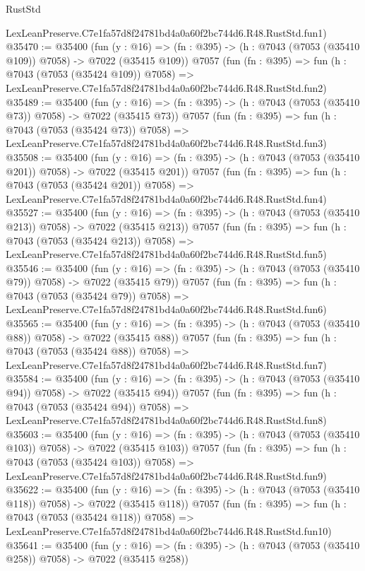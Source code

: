 \begin{lexlean}{RustStd}
\begin{coremodule}
    LexLeanPreserve.C7e1fa57d8f24781bd4a0a60f2bc744d6.R48.RustStd.fun1)
@35470 := @35400
    (fun (y : @16) => (fn : @395) -> (h : @7043 (@7053 (@35410 @109)) @7058) -> @7022 (@35415 @109))
    @7057
    (fun (fn : @395) =>
    fun (h : @7043 (@7053 (@35424 @109)) @7058) =>
    LexLeanPreserve.C7e1fa57d8f24781bd4a0a60f2bc744d6.R48.RustStd.fun2)
@35489 := @35400
    (fun (y : @16) => (fn : @395) -> (h : @7043 (@7053 (@35410 @73)) @7058) -> @7022 (@35415 @73))
    @7057
    (fun (fn : @395) =>
    fun (h : @7043 (@7053 (@35424 @73)) @7058) =>
    LexLeanPreserve.C7e1fa57d8f24781bd4a0a60f2bc744d6.R48.RustStd.fun3)
@35508 := @35400
    (fun (y : @16) => (fn : @395) -> (h : @7043 (@7053 (@35410 @201)) @7058) -> @7022 (@35415 @201))
    @7057
    (fun (fn : @395) =>
    fun (h : @7043 (@7053 (@35424 @201)) @7058) =>
    LexLeanPreserve.C7e1fa57d8f24781bd4a0a60f2bc744d6.R48.RustStd.fun4)
@35527 := @35400
    (fun (y : @16) => (fn : @395) -> (h : @7043 (@7053 (@35410 @213)) @7058) -> @7022 (@35415 @213))
    @7057
    (fun (fn : @395) =>
    fun (h : @7043 (@7053 (@35424 @213)) @7058) =>
    LexLeanPreserve.C7e1fa57d8f24781bd4a0a60f2bc744d6.R48.RustStd.fun5)
@35546 := @35400
    (fun (y : @16) => (fn : @395) -> (h : @7043 (@7053 (@35410 @79)) @7058) -> @7022 (@35415 @79))
    @7057
    (fun (fn : @395) =>
    fun (h : @7043 (@7053 (@35424 @79)) @7058) =>
    LexLeanPreserve.C7e1fa57d8f24781bd4a0a60f2bc744d6.R48.RustStd.fun6)
@35565 := @35400
    (fun (y : @16) => (fn : @395) -> (h : @7043 (@7053 (@35410 @88)) @7058) -> @7022 (@35415 @88))
    @7057
    (fun (fn : @395) =>
    fun (h : @7043 (@7053 (@35424 @88)) @7058) =>
    LexLeanPreserve.C7e1fa57d8f24781bd4a0a60f2bc744d6.R48.RustStd.fun7)
@35584 := @35400
    (fun (y : @16) => (fn : @395) -> (h : @7043 (@7053 (@35410 @94)) @7058) -> @7022 (@35415 @94))
    @7057
    (fun (fn : @395) =>
    fun (h : @7043 (@7053 (@35424 @94)) @7058) =>
    LexLeanPreserve.C7e1fa57d8f24781bd4a0a60f2bc744d6.R48.RustStd.fun8)
@35603 := @35400
    (fun (y : @16) => (fn : @395) -> (h : @7043 (@7053 (@35410 @103)) @7058) -> @7022 (@35415 @103))
    @7057
    (fun (fn : @395) =>
    fun (h : @7043 (@7053 (@35424 @103)) @7058) =>
    LexLeanPreserve.C7e1fa57d8f24781bd4a0a60f2bc744d6.R48.RustStd.fun9)
@35622 := @35400
    (fun (y : @16) => (fn : @395) -> (h : @7043 (@7053 (@35410 @118)) @7058) -> @7022 (@35415 @118))
    @7057
    (fun (fn : @395) =>
    fun (h : @7043 (@7053 (@35424 @118)) @7058) =>
    LexLeanPreserve.C7e1fa57d8f24781bd4a0a60f2bc744d6.R48.RustStd.fun10)
@35641 := @35400
    (fun (y : @16) => (fn : @395) -> (h : @7043 (@7053 (@35410 @258)) @7058) -> @7022 (@35415 @258))

\end{coremodule}
\end{lexlean}
